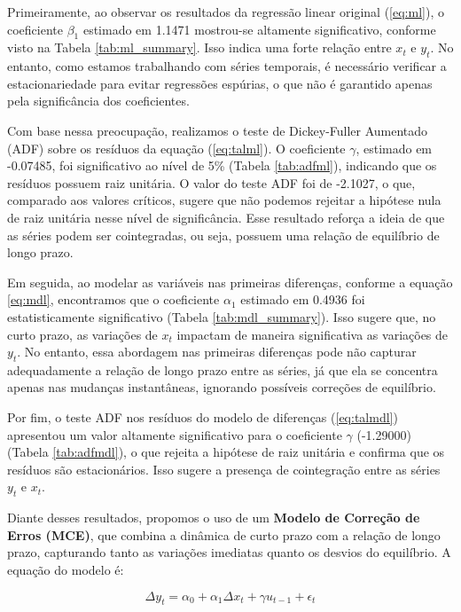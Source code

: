 \documentclass[a4paper,12pt]{article}[abntex2]
\begin{document}
Primeiramente, ao observar os resultados da regressão linear original (\ref{eq:ml}), o coeficiente $\beta_1$ estimado em 1.1471 mostrou-se altamente significativo, conforme visto na Tabela \ref{tab:ml_summary}. Isso indica uma forte relação entre $x_t$ e $y_t$. No entanto, como estamos trabalhando com séries temporais, é necessário verificar a estacionariedade para evitar regressões espúrias, o que não é garantido apenas pela significância dos coeficientes.

Com base nessa preocupação, realizamos o teste de Dickey-Fuller Aumentado (ADF) sobre os resíduos da equação (\ref{eq:talml}). O coeficiente $\gamma$, estimado em -0.07485, foi significativo ao nível de 5\% (Tabela \ref{tab:adfml}), indicando que os resíduos possuem raiz unitária. O valor do teste ADF foi de -2.1027, o que, comparado aos valores críticos, sugere que não podemos rejeitar a hipótese nula de raiz unitária nesse nível de significância. Esse resultado reforça a ideia de que as séries podem ser cointegradas, ou seja, possuem uma relação de equilíbrio de longo prazo.

Em seguida, ao modelar as variáveis nas primeiras diferenças, conforme a equação \ref{eq:mdl}, encontramos que o coeficiente $\alpha_1$ estimado em 0.4936 foi estatisticamente significativo (Tabela \ref{tab:mdl_summary}). Isso sugere que, no curto prazo, as variações de $x_t$ impactam de maneira significativa as variações de $y_t$. No entanto, essa abordagem nas primeiras diferenças pode não capturar adequadamente a relação de longo prazo entre as séries, já que ela se concentra apenas nas mudanças instantâneas, ignorando possíveis correções de equilíbrio.

Por fim, o teste ADF nos resíduos do modelo de diferenças (\ref{eq:talmdl}) apresentou um valor altamente significativo para o coeficiente $\gamma$ (-1.29000) (Tabela \ref{tab:adfmdl}), o que rejeita a hipótese de raiz unitária e confirma que os resíduos são estacionários. Isso sugere a presença de cointegração entre as séries $y_t$ e $x_t$.

Diante desses resultados, propomos o uso de um \textbf{Modelo de Correção de Erros (MCE)}, que combina a dinâmica de curto prazo com a relação de longo prazo, capturando tanto as variações imediatas quanto os desvios do equilíbrio. A equação do modelo é:

\begin{equation}
    \Delta y_t = \alpha_0 + \alpha_1 \Delta x_t + \gamma u_{t-1} + \epsilon_t
\end{equation}
\end{document}
